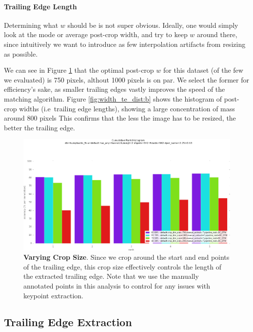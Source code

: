 \paragraph{Trailing Edge Length}

Determining what $w$ should be is not super obvious.
Ideally, one would simply look at the mode or average post-crop width, and try to keep $w$ around there, since intuitively we want to introduce as few interpolation artifacts from resizing as possible.

We can see in Figure \ref{fig:vary_crop_size} that the optimal post-crop $w$ for this dataset (of the few we evaluated) is 750 pixels, althout 1000 pixels is on par.
We select the former for efficiency's sake, as smaller trailing edges vastly improves the speed of the matching algorithm.
Figure \ref{fig:width_te_dist:b} shows the histogram of post-crop widths (i.e\ trailing edge lengths), showing a large concentration of mass around 800 pixels 
This confirms that the less the image has to be resized, the better the trailing edge.

\begin{figure}[t]%
\centering
\includegraphics[width=1\textwidth]{../images/results/vary_crop_size.png}
\caption[]{\textbf{Varying Crop Size}. Since we crop around the start and end points of the trailing edge, this crop size effectively controls the length of the extracted trailing edge. Note that we use the manually annotated points in this analysis to control for any issues with keypoint extraction.}
\label{fig:vary_crop_size}
\end{figure}


\subsection{Trailing Edge Extraction}

